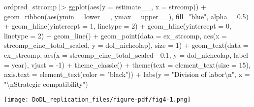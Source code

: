 \documentclass[
  12,
  letterpaper,
  DIV=11,
  numbers=noendperiod]{scrartcl}
\newenvironment{Shaded}{\begin{snugshade}}{\end{snugshade}}
\newcommand{\AttributeTok}[1]{\textcolor[rgb]{0.40,0.45,0.13}{#1}}
\newcommand{\DecValTok}[1]{\textcolor[rgb]{0.68,0.00,0.00}{#1}}
\newcommand{\FloatTok}[1]{\textcolor[rgb]{0.68,0.00,0.00}{#1}}
\newcommand{\FunctionTok}[1]{\textcolor[rgb]{0.28,0.35,0.67}{#1}}
\newcommand{\NormalTok}[1]{\textcolor[rgb]{0.00,0.23,0.31}{#1}}
\newcommand{\SpecialCharTok}[1]{\textcolor[rgb]{0.37,0.37,0.37}{#1}}
\newcommand{\StringTok}[1]{\textcolor[rgb]{0.13,0.47,0.30}{#1}}
\begin{document}
\begin{Shaded}
\begin{Highlighting}[numbers=left,,]
\NormalTok{ordpred\_strcomp }\SpecialCharTok{|\textgreater{}}  
  \FunctionTok{ggplot}\NormalTok{(}\FunctionTok{aes}\NormalTok{(}\AttributeTok{y =}\NormalTok{ estimate\_\_, }\AttributeTok{x =}\NormalTok{ strcomp)) }\SpecialCharTok{+}
  \FunctionTok{geom\_ribbon}\NormalTok{(}\FunctionTok{aes}\NormalTok{(}\AttributeTok{ymin =}\NormalTok{ lower\_\_,}
                  \AttributeTok{ymax =}\NormalTok{ upper\_\_), }\AttributeTok{fill=}\StringTok{"blue"}\NormalTok{,}
              \AttributeTok{alpha =} \FloatTok{0.5}\NormalTok{) }\SpecialCharTok{+}
  \FunctionTok{geom\_hline}\NormalTok{(}\AttributeTok{yintercept =} \DecValTok{1}\NormalTok{, }\AttributeTok{linetype =} \DecValTok{2}\NormalTok{) }\SpecialCharTok{+}
  \FunctionTok{geom\_hline}\NormalTok{(}\AttributeTok{yintercept =} \DecValTok{0}\NormalTok{, }\AttributeTok{linetype =} \DecValTok{2}\NormalTok{) }\SpecialCharTok{+}
  \FunctionTok{geom\_line}\NormalTok{() }\SpecialCharTok{+}
  \FunctionTok{geom\_point}\NormalTok{(}\AttributeTok{data =}\NormalTok{ ex\_strcomp, }
             \FunctionTok{aes}\NormalTok{(}\AttributeTok{x =}\NormalTok{ strcomp\_cinc\_total\_scaled, }\AttributeTok{y =}\NormalTok{ dol\_nicheolap), }
             \AttributeTok{size =} \DecValTok{1}\NormalTok{) }\SpecialCharTok{+}
  \FunctionTok{geom\_text}\NormalTok{(}\AttributeTok{data =}\NormalTok{ ex\_strcomp, }
            \FunctionTok{aes}\NormalTok{(}\AttributeTok{x =}\NormalTok{ strcomp\_cinc\_total\_scaled }\SpecialCharTok{{-}} \FloatTok{0.1}\NormalTok{, }\AttributeTok{y =}\NormalTok{ dol\_nicheolap, }\AttributeTok{label =}\NormalTok{ year), }
            \AttributeTok{vjust =} \SpecialCharTok{{-}}\DecValTok{1}\NormalTok{) }\SpecialCharTok{+}
  \FunctionTok{theme\_classic}\NormalTok{() }\SpecialCharTok{+}
  \FunctionTok{theme}\NormalTok{(}\AttributeTok{text =} \FunctionTok{element\_text}\NormalTok{(}\AttributeTok{size =} \DecValTok{15}\NormalTok{),}
        \AttributeTok{axis.text =} \FunctionTok{element\_text}\NormalTok{(}\AttributeTok{color =} \StringTok{"black"}\NormalTok{)) }\SpecialCharTok{+}
  \FunctionTok{labs}\NormalTok{(}\AttributeTok{y =} \StringTok{"Division of labor}\SpecialCharTok{\textbackslash{}n}\StringTok{"}\NormalTok{,}
       \AttributeTok{x =} \StringTok{"}\SpecialCharTok{\textbackslash{}n}\StringTok{Strategic compatibility"}\NormalTok{)}
\end{Highlighting}
\end{Shaded}

\texttt{[image: DoDL\_replication\_files/figure-pdf/fig4-1.png]}
\end{document}
